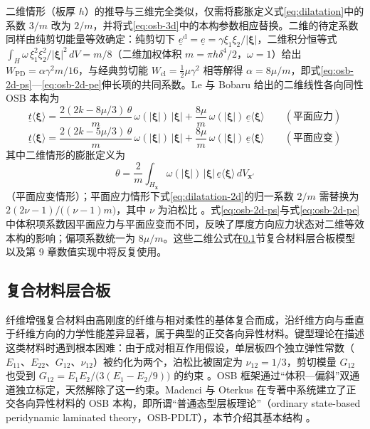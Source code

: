 二维情形（板厚 $h$）的推导与三维完全类似，仅需将膨胀定义式\eqref{eq:dilatation}中的系数 $3/m$ 改为 $2/m$，并将式\eqref{eq:osb-3d}中的本构参数相应替换。二维的待定系数同样由纯剪切能量等效确定：纯剪切下 $\underline{e}^{\mathrm{d}}=\underline{e}=\gamma\xi_{1}\xi_{2}/|\boldsymbol{\xi}|$，二维积分恒等式 $\int_{H}\omega\,\xi_{1}^{2}\xi_{2}^{2}/|\boldsymbol{\xi}|^{2}\,dV=m/8$（二维加权体积 $m=\pi h\delta^{4}/2$，$\omega=1$）给出 $W_{\mathrm{PD}}=\alpha\gamma^{2}m/16$，与经典剪切能 $W_{\mathrm{cl}}=\tfrac{1}{2}\mu\gamma^{2}$ 相等解得 $\alpha=8\mu/m$，即式\eqref{eq:osb-2d-ps}—\eqref{eq:osb-2d-pe}伸长项的共同系数。Le 与 Bobaru 给出的二维线性各向同性 OSB 本构为 \cite{LeBobaru2018Obj}
\begin{equation}
  \underline{t}\langle\boldsymbol{\xi}\rangle=
  \frac{2(2k-8\mu/3)\,\theta}{m}\,\omega(|\boldsymbol{\xi}|)\,|\boldsymbol{\xi}|+
  \frac{8\mu}{m}\,\omega(|\boldsymbol{\xi}|)\,\underline{e}\langle\boldsymbol{\xi}\rangle
  \qquad(\text{平面应力})
  \label{eq:osb-2d-ps}
\end{equation}
\begin{equation}
  \underline{t}\langle\boldsymbol{\xi}\rangle=
  \frac{2(2k-5\mu/3)\,\theta}{m}\,\omega(|\boldsymbol{\xi}|)\,|\boldsymbol{\xi}|+
  \frac{8\mu}{m}\,\omega(|\boldsymbol{\xi}|)\,\underline{e}\langle\boldsymbol{\xi}\rangle
  \qquad(\text{平面应变})
  \label{eq:osb-2d-pe}
\end{equation}
其中二维情形的膨胀定义为
\begin{equation}
  \theta=\frac{2}{m}\int_{H_{\mathbf{x}}}\omega(|\boldsymbol{\xi}|)\,|\boldsymbol{\xi}|\,\underline{e}\langle\boldsymbol{\xi}\rangle\,dV_{\mathbf{x}'}
  \label{eq:dilatation-2d}
\end{equation}
（平面应变情形）；平面应力情形下式\eqref{eq:dilatation-2d}的归一系数 $2/m$ 需替换为 $2(2\nu-1)/\bigl((\nu-1)m\bigr)$，其中 $\nu$ 为泊松比 \cite{LeBobaru2018Obj}。式\eqref{eq:osb-2d-ps}与式\eqref{eq:osb-2d-pe}中体积项系数因平面应力与平面应变而不同，反映了厚度方向应力状态对二维等效本构的影响；偏项系数统一为 $8\mu/m$。这些二维公式在\ref{sec:osb-composite}节复合材料层合板模型以及第 9 章数值实现中将反复使用。

\subsection{复合材料层合板}\label{sec:osb-composite}

纤维增强复合材料由高刚度的纤维与相对柔性的基体复合而成，沿纤维方向与垂直于纤维方向的力学性能差异显著，属于典型的正交各向异性材料。键型理论在描述这类材料时遇到根本困难：由于成对相互作用假设，单层板四个独立弹性常数（$E_{11}$、$E_{22}$、$G_{12}$、$\nu_{12}$）被约化为两个，泊松比被固定为 $\nu_{12}=1/3$，剪切模量 $G_{12}$ 也受到 $G_{12}=E_{1}E_{2}/\bigl(3(E_{1}-E_{2}/9)\bigr)$ 的约束 \cite{OterkusMadenci2012,HuHaBobaru2012}。OSB 框架通过“体积—偏斜”双通道独立标定，天然解除了这一约束。Madenci 与 Oterkus 在专著中系统建立了正交各向异性材料的 OSB 本构，即所谓“普通态型层板理论”（ordinary state-based peridynamic laminated theory，OSB-PDLT），本节介绍其基本结构 \cite{MadenciOterkus2014}。

